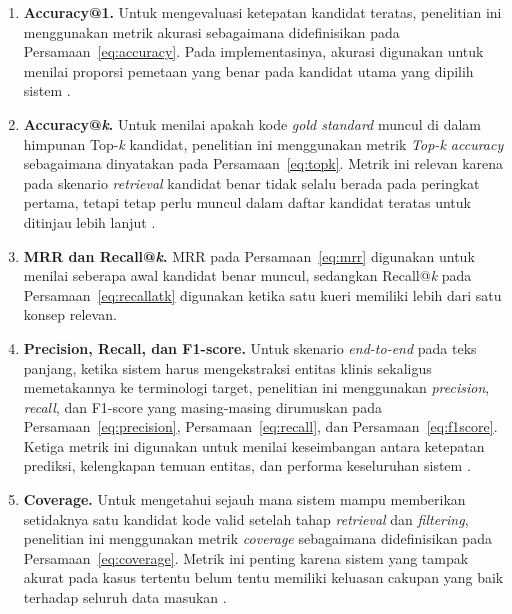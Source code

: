 \begin{enumerate}
    \item \textbf{Accuracy@1.} Untuk mengevaluasi ketepatan kandidat teratas, penelitian ini menggunakan metrik akurasi sebagaimana didefinisikan pada Persamaan~\ref{eq:accuracy}. Pada implementasinya, akurasi digunakan untuk menilai proporsi pemetaan yang benar pada kandidat utama yang dipilih sistem \citep{chen_clinical_2020,gilani_cde-mapper_2025}.

    \item \textbf{Accuracy@\textit{k}.} Untuk menilai apakah kode \textit{gold standard} muncul di dalam himpunan Top-\textit{k} kandidat, penelitian ini menggunakan metrik \textit{Top-k accuracy} sebagaimana dinyatakan pada Persamaan~\ref{eq:topk}. Metrik ini relevan karena pada skenario \textit{retrieval} kandidat benar tidak selalu berada pada peringkat pertama, tetapi tetap perlu muncul dalam daftar kandidat teratas untuk ditinjau lebih lanjut \citep{he_bertmap_2022,gilani_cde-mapper_2025,park_development_2026}.

    \item \textbf{MRR dan Recall@\textit{k}.} MRR pada Persamaan~\ref{eq:mrr} digunakan untuk menilai seberapa awal kandidat benar muncul, sedangkan Recall@\textit{k} pada Persamaan~\ref{eq:recallatk} digunakan ketika satu kueri memiliki lebih dari satu konsep relevan.

    \item \textbf{Precision, Recall, dan F1-score.} Untuk skenario \textit{end-to-end} pada teks panjang, ketika sistem harus mengekstraksi entitas klinis sekaligus memetakannya ke terminologi target, penelitian ini menggunakan \textit{precision}, \textit{recall}, dan F1-score yang masing-masing dirumuskan pada Persamaan~\ref{eq:precision}, Persamaan~\ref{eq:recall}, dan Persamaan~\ref{eq:f1score}. Ketiga metrik ini digunakan untuk menilai keseimbangan antara ketepatan prediksi, kelengkapan temuan entitas, dan performa keseluruhan sistem \citep{chen_clinical_2020}.

    \item \textbf{Coverage.} Untuk mengetahui sejauh mana sistem mampu memberikan setidaknya satu kandidat kode valid setelah tahap \textit{retrieval} dan \textit{filtering}, penelitian ini menggunakan metrik \textit{coverage} sebagaimana didefinisikan pada Persamaan~\ref{eq:coverage}. Metrik ini penting karena sistem yang tampak akurat pada kasus tertentu belum tentu memiliki keluasan cakupan yang baik terhadap seluruh data masukan \citep{gilani_cde-mapper_2025,park_development_2026}.


\end{enumerate}
